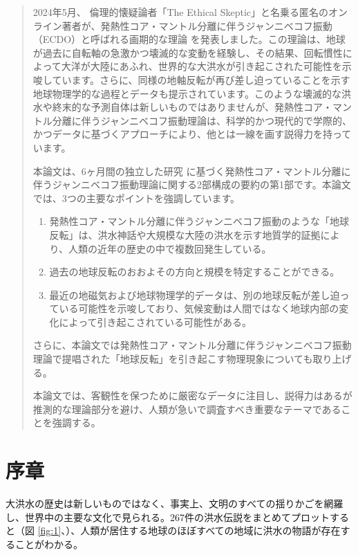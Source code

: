 \documentclass[10pt,twocolumn,letterpaper]{article}
\begin{document}
\begin{abstract}
2024年5月、 倫理的懐疑論者「The Ethical Skeptic」と名乗る匿名のオンライン著者が、発熱性コア・マントル分離に伴うジャンニベコフ振動（ECDO）と呼ばれる画期的な理論 \cite{0}\cite{1} を発表しました。この理論は、地球が過去に自転軸の急激かつ壊滅的な変動を経験し、その結果、回転慣性によって大洋が大陸にあふれ、世界的な大洪水が引き起こされた可能性を示唆しています。さらに、同様の地軸反転が再び差し迫っていることを示す地球物理学的な過程とデータも提示されています。このような壊滅的な洪水や終末的な予測自体は新しいものではありませんが、発熱性コア・マントル分離に伴うジャンニベコフ振動理論は、科学的かつ現代的で学際的、かつデータに基づくアプローチにより、他とは一線を画す説得力を持っています。

本論文は、6ヶ月間の独立した研究 \cite{2,20} に基づく発熱性コア・マントル分離に伴うジャンニベコフ振動理論に関する2部構成の要約の第1部です。本論文では、3つの主要なポイントを強調しています。

\begin{flushleft}
\begin{enumerate}
    \item 発熱性コア・マントル分離に伴うジャンニベコフ振動のような「地球反転」は、洪水神話や大規模な大陸の洪水を示す地質学的証拠により、人類の近年の歴史の中で複数回発生している。
    \item 過去の地球反転のおおよその方向と規模を特定することができる。
    \item 最近の地磁気および地球物理学的データは、別の地球反転が差し迫っている可能性を示唆しており、気候変動は人間ではなく地球内部の変化によって引き起こされている可能性がある。
\end{enumerate}
\end{flushleft}

さらに、本論文では発熱性コア・マントル分離に伴うジャンニベコフ振動理論で提唱された「地球反転」を引き起こす物理現象についても取り上げる。

本論文では、客観性を保つために厳密なデータに注目し、説得力はあるが推測的な理論部分を避け、人類が急いで調査すべき重要なテーマであることを強調する。
\end{abstract}

\section{序章}

大洪水の歴史は新しいものではなく、事実上、文明のすべての揺りかごを網羅し、世界中の主要な文化で見られる。267件の洪水伝説をまとめてプロットすると（図 \ref{fig:1}、\cite{3}）、人類が居住する地球のほぼすべての地域に洪水の物語が存在することがわかる。
\end{document}
